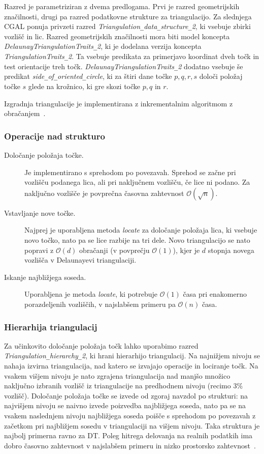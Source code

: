 \documentclass[a4paper, 12pt]{book}
\newcommand{\OO}{\ensuremath{\mathcal{O}}} %
\newcommand{\U}{\texttt{\_}}
\begin{document}
Razred je parametriziran z dvema predlogama. Prvi je razred geometrijskih značilnosti, drugi pa razred podatkovne strukture za triangulacijo. Za slednjega CGAL ponuja privzeti razred \textit{ Triangulation\U data\U structure\U 2}, ki vsebuje zbirki vozlišč in lic. Razred geometrijskih značilnosti mora biti model koncepta \textit{DelaunayTriangulationTraits\U 2}, ki je dodelana verzija koncepta \textit{TriangulationTraits\U 2}. Ta vsebuje predikata za primerjavo koordinat dveh točk in test orientacije treh točk. \textit{DelaunayTriangulationTraits\U 2} dodatno vsebuje še predikat \textit{side\U of\U oriented\U circle}, ki za štiri dane točke $p, q, r, s$ določi položaj točke $s$ glede na krožnico, ki gre skozi točke $p, q$ in $r$.

Izgradnja triangulacije je implementirana z inkrementalnim algoritmom z obračanjem~\cite{cgal:y-t2-16b}.

\subsubsection{Operacije nad strukturo}
\begin{description}
\item[Določanje položaja točke.] Je implementirano s sprehodom po povezavah. Sprehod se začne pri vozlišču podanega lica, ali pri naključnem vozlišču, če lice ni podano. Za naključno vozlišče je povprečna časovna zahtevnost $\OO(\sqrt{n})$.
\item[Vstavljanje nove točke.] Najprej je uporabljena metoda \textit{locate} za določa\-nje položaja lica, ki vsebuje novo točko, nato pa se lice razbije na tri dele. Novo triangulacijo se nato popravi z $\OO(d)$ obračanji (v povprečju $\OO(1)$), kjer je $d$ stopnja novega vozlišča v Delaunayevi triangulaciji.
\item[Iskanje najbližjega soseda.] Uporabljena je metoda \textit{locate}, ki potrebuje $\OO(1)$ časa pri enakomerno porazdeljenih vozliščih, v najslabšem primeru pa $\OO(n)$ časa.
\end{description}

\subsubsection{Hierarhija triangulacij}
Za učinkovito določanje položaja točk lahko uporabimo razred \textit{Trian\-gu\-la\-tion\U hier\-archy\U 2}, ki hrani hierarhijo triangulacij. Na najnižjem nivoju se nahaja izvirna triangulacija, nad katero se izvajajo operacije in lociranje točk. Na vsakem višjem nivoju je nato zgrajena triangulacija nad manjšo množico naključno izbranih vozlišč iz triangulacije na predhodnem nivoju (recimo 3\% vozlišč). Določanje položaja točke se izvede od zgoraj navzdol po strukturi: na najvišjem nivoju se naivno izvede poizvedba najbližjega soseda, nato pa se na vsakem naslednjem nivoju najbližjega soseda poišče s sprehodom po povezavah z začetkom pri najbližjem sosedu v triangulaciji na višjem nivoju. Taka struktura je najbolj primerna ravno za DT. Poleg hitrega delovanja na realnih podatkih ima dobro časovno zahtevnost v najslabšem primeru in nizko prostorsko zahtevnost~\cite{Olivier}.
\end{document}
